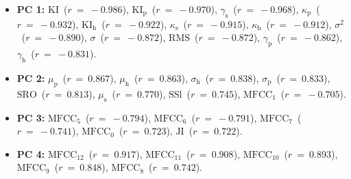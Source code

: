\begin{itemize}
	\item {\bf{PC 1:}} $\textrm{KI}$~($r~=~-0.986$), $\textrm{KI}_{\textrm{p}}$~($r~=~-0.970$), $\gamma_{\textrm{s}}$~($r~=~-0.968$), $\kappa_{\textrm{p}}$~($r~=~-0.932$), $\textrm{KI}_{\textrm{h}}$~($r~=~-0.922$), $\kappa_{\textrm{s}}$~($r~=~-0.915$), $\kappa_{\textrm{h}}$~($r~=~-0.912$), $\sigma^{2}$~($r~=~-0.890$), $\sigma$~($r~=~-0.872$), $\textrm{RMS}$~($r~=~-0.872$), $\gamma_{\textrm{p}}$~($r~=~-0.862$), $\gamma_{\textrm{h}}$~($r~=~-0.831$).
	\item {\bf{PC 2:}} $\mu_{\textrm{p}}$~($r~=~ 0.867$), $\mu_{\textrm{h}}$~($r~=~ 0.863$), $\sigma_{\textrm{h}}$~($r~=~ 0.838$), $\sigma_{\textrm{p}}$~($r~=~ 0.833$), $\textrm{SRO}$~($r~=~ 0.813$), $\mu_{\textrm{s}}$~($r~=~ 0.770$), $\textrm{SSl}$~($r~=~ 0.745$), $\textrm{MFCC}_{1}$~($r~=~-0.705$).
	\item {\bf{PC 3:}} $\textrm{MFCC}_{5}$~($r~=~-0.794$), $\textrm{MFCC}_{6}$~($r~=~-0.791$), $\textrm{MFCC}_{7}$~($r~=~-0.741$), $\textrm{MFCC}_{0}$~($r~=~ 0.723$), $\textrm{JI}$~($r~=~ 0.722$).
	\item {\bf{PC 4:}} $\textrm{MFCC}_{12}$~($r~=~0.917$), $\textrm{MFCC}_{11}$~($r~=~0.908$), $\textrm{MFCC}_{10}$~($r~=~0.893$), $\textrm{MFCC}_{9}$~($r~=~0.848$), $\textrm{MFCC}_{8}$~($r~=~0.742$).
\end{itemize}

